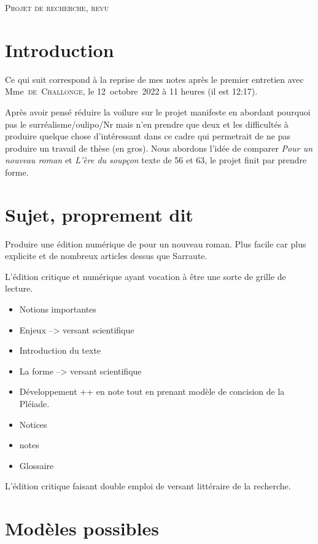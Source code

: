 \documentclass[12pt, a4paper]{article}
\begin{document}
\vspace*{3cm}


\begin{center}
\textsc{Projet de recherche, revu}
\end{center}
\vspace{3cm}

\section{Introduction}
\small Ce qui suit correspond à la reprise de mes notes après le premier entretien avec Mme~\textsc{de~Challonge}, le 12~octobre~2022 à 11 heures (il est 12:17).

\vspace{1cm}
\normalsize
Après avoir pensé réduire la voilure sur le projet manifeste en abordant pourquoi pas le surréalisme/oulipo/Nr mais n'en prendre que deux et les difficultés à produire quelque chose d'intéressant dans ce cadre qui permetrait de ne pas produire un travail de thèse (en gros). Nous abordons l'idée de comparer \textit{Pour un nouveau roman} et \textit{L'ère du soupçon} texte de 56 et 63, le projet finit par prendre forme.

\section{Sujet, proprement dit}
Produire une édition numérique de pour un nouveau roman.
Plus facile car plus explicite et de nombreux articles dessus que Sarraute.

L'édition critique et numérique ayant vocation à être une sorte de grille de lecture.
\begin{itemize}
    \item Notions importantes
    \item Enjeux --> versant scientifique
    \item Introduction du texte
    \item La forme --> versant scientifique
    \item Développement ++ en note tout en prenant modèle de concision de la Pléiade.
    \item Notices
    \item notes
    \item Glossaire
\end{itemize}

L'édition critique faisant double emploi de versant littéraire de la recherche.


\section{Modèles possibles}
\end{document}
